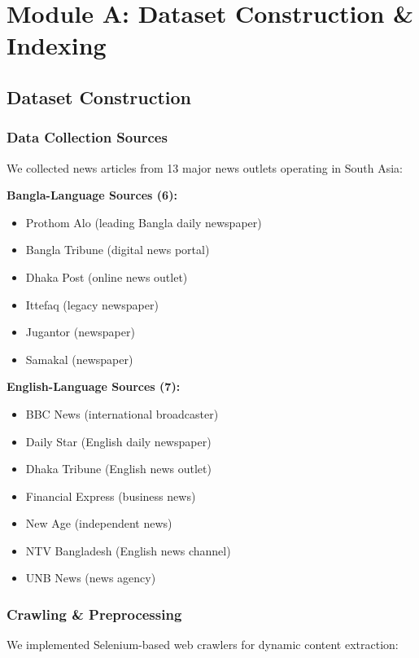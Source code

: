 \documentclass[12pt,a4paper]{report}
\begin{document}
\section{Module A: Dataset Construction \& Indexing}

\subsection{Dataset Construction}

\subsubsection{Data Collection Sources}

We collected news articles from 13 major news outlets operating in South Asia:

\textbf{Bangla-Language Sources (6):}
\begin{itemize}
    \item Prothom Alo (leading Bangla daily newspaper)
    \item Bangla Tribune (digital news portal)
    \item Dhaka Post (online news outlet)
    \item Ittefaq (legacy newspaper)
    \item Jugantor (newspaper)
    \item Samakal (newspaper)
\end{itemize}

\textbf{English-Language Sources (7):}
\begin{itemize}
    \item BBC News (international broadcaster)
    \item Daily Star (English daily newspaper)
    \item Dhaka Tribune (English news outlet)
    \item Financial Express (business news)
    \item New Age (independent news)
    \item NTV Bangladesh (English news channel)
    \item UNB News (news agency)
\end{itemize}

\subsubsection{Crawling \& Preprocessing}

We implemented Selenium-based web crawlers for dynamic content extraction:
\end{document}
